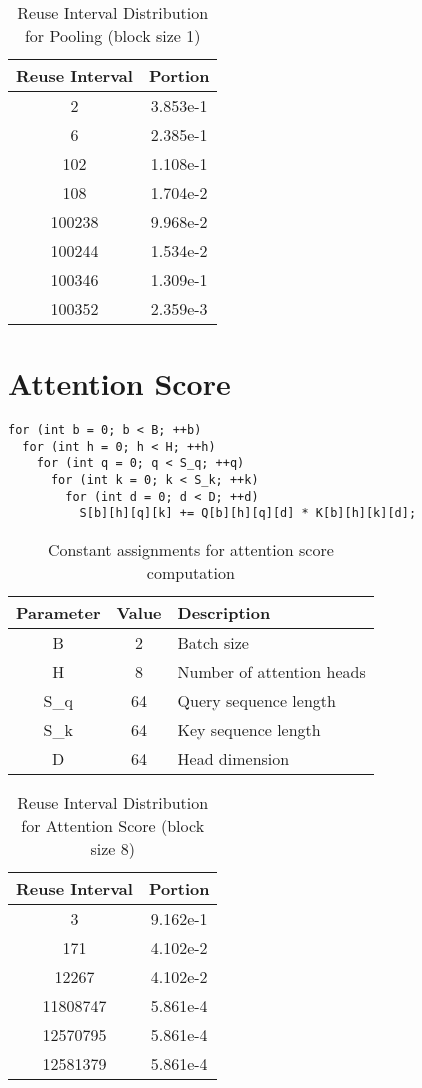 \documentclass[conference]{article}
\begin{document}
\begin{table}[H]
\centering
\begin{tabular}{|c|c|}
    \hline
    Reuse Interval & Portion \\ 
    \hline
    2 & 3.853e-1 \\ 
    6 & 2.385e-1 \\ 
    102 & 1.108e-1 \\ 
    108 & 1.704e-2 \\ 
    100238 & 9.968e-2 \\ 
    100244 & 1.534e-2 \\ 
    100346 & 1.309e-1 \\ 
    100352 & 2.359e-3 \\ 
    \hline
\end{tabular}
\caption{Reuse Interval Distribution for Pooling (block size 1)}
\end{table}

\section{Attention Score}
\begin{verbatim}
for (int b = 0; b < B; ++b)
  for (int h = 0; h < H; ++h)
    for (int q = 0; q < S_q; ++q)
      for (int k = 0; k < S_k; ++k)
        for (int d = 0; d < D; ++d)
          S[b][h][q][k] += Q[b][h][q][d] * K[b][h][k][d];  
\end{verbatim}

\begin{table}[H]
\centering
  \begin{tabular}{|c|c|l|}
  \hline
  Parameter & Value & Description \\
  \hline
    B & 2 & Batch size \\
    H & 8 & Number of attention heads \\
    S\_q & 64 & Query sequence length \\
    S\_k & 64 & Key sequence length \\
    D & 64 & Head dimension \\
  \hline
  \end{tabular}
  \caption{Constant assignments for attention score computation}
\end{table}

\begin{table}[H]
\centering
\begin{tabular}{|c|c|}
    \hline
    Reuse Interval & Portion \\ 
    \hline
    3 & 9.162e-1 \\ 
    171 & 4.102e-2 \\ 
    12267 & 4.102e-2 \\ 
    11808747 & 5.861e-4 \\ 
    12570795 & 5.861e-4 \\ 
    12581379 & 5.861e-4 \\ 
    \hline
\end{tabular}
\caption{Reuse Interval Distribution for Attention Score (block size 8)}
\end{table}
\end{document}
